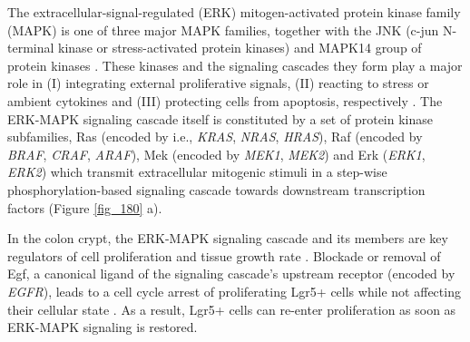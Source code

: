 \begin{flushleft}
The extracellular-signal-regulated (ERK) mitogen-activated protein kinase family (MAPK) is one of three major MAPK families, together with the JNK (c-jun N-terminal kinase or stress-activated protein kinases) and MAPK14 group of protein kinases \parencite{zhangMAPKSignalPathways2002}. These kinases and the signaling cascades they form play a major role in (I) integrating external proliferative signals, (II) reacting to stress or ambient cytokines and (III) protecting cells from apoptosis, respectively \parencite{fangMAPKSignallingPathways2005}. The ERK-MAPK signaling cascade itself is constituted by a set of protein kinase subfamilies, Ras (encoded by i.e., \textit{KRAS}, \textit{NRAS}, \textit{HRAS}), Raf (encoded by \textit{BRAF}, \textit{CRAF}, \textit{ARAF}), Mek (encoded by \textit{MEK1}, \textit{MEK2}) and Erk (\textit{ERK1}, \textit{ERK2}) which transmit extracellular mitogenic stimuli in a step-wise phosphorylation-based signaling cascade towards downstream transcription factors (Figure \ref{fig_180} a). \par

In the colon crypt, the ERK-MAPK signaling cascade and its members are key regulators of cell proliferation and tissue growth rate \parencite{hTalesCryptNew2019}. Blockade or removal of Egf, a canonical ligand of the signaling cascade's upstream receptor (encoded by \textit{EGFR}), leads to a cell cycle arrest of proliferating Lgr5+ cells while not affecting their cellular state \parencite{basakInducedQuiescenceLgr52017}. As a result, Lgr5+ cells can re-enter proliferation as soon as ERK-MAPK signaling is restored.
\par


\end{flushleft}
